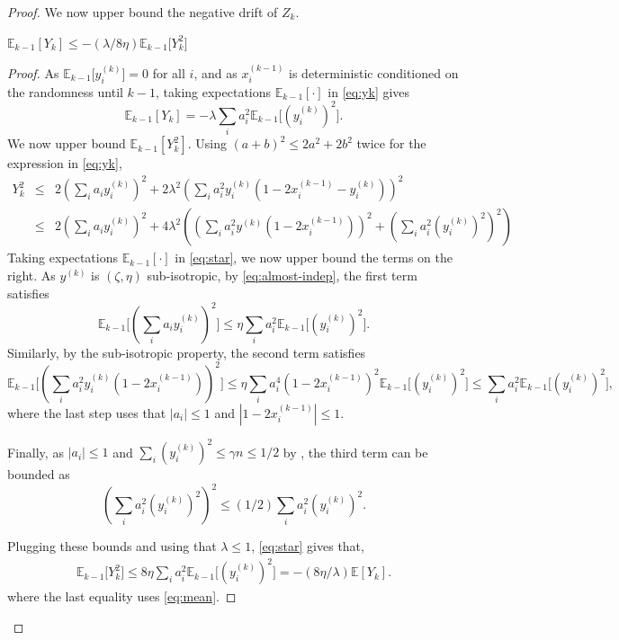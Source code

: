 \documentclass{toc}
\newcommand{\E}{\mathbb{E}}
\begin{document}
\begin{proof}
We now upper bound the negative drift of $Z_k$.
\begin{claim}
\label{cool-calc}
$  \E_{k-1}[Y_k] \leq - (\lambda/8 \eta)  \E_{k-1}\big[Y_k^2 \big] $
\end{claim}
\begin{proof}
As $\E_{k-1}\big[y_i^{(k)}\big]=0$ for all $i$, and as $x_i^{(k-1)}$ is deterministic conditioned on the randomness until $k-1$,  taking expectations $\E_{k-1}[\cdot ]$ in \eqref{eq:yk} gives
\begin{equation}
    \label{eq:mean}
 \E_{k-1}[Y_k] = -\lambda \sum_i a_i^2 \E_{k-1}\big[(y_i^{(k)})^2\big].
\end{equation}
We now upper bound $\E_{k-1}[Y_k^2]$.
Using $(a+b)^2 \leq 2 a^2 + 2b^2$ twice for the expression in \eqref{eq:yk},
\begin{eqnarray}
Y_k^2  & \leq &  2 (\sum_i a_i y_i^{(k)})^2
+ 2   \lambda^2 \left(\sum_i a_i^2  y_i^{(k)} (1- 2  x_i^{(k-1)} - y_i^{(k)}) \right)^2 \nonumber \\
 & \leq &   2 (\sum_i a_i y_i^{(k)})^2 + 4 \lambda^2 \left( \left(\sum_i a_i^2 y^{(k)} (1- 2  x_i^{(k-1)}) \right)^2  + \left(\sum_i a_i^2  (y_i^{(k)})^2 \right)^2 \right)  \label{eq:star}
%
\end{eqnarray}
%
%
%
Taking expectations $\E_{k-1}[\cdot ]$ in \eqref{eq:star}, we now upper bound the terms on the right.
%
%
%
%
%
As $y^{(k)}$ is $(\zeta,\eta)$ sub-isotropic, by \eqref{eq:almost-indep}, the first term satisfies
\[\E_{k-1}\Big[(\sum_i a_i y_i^{(k)})^2 \Big] \leq \eta \sum_i a_i^2
\E_{k-1}\big[(y_i^{(k)})^2\big].\]
Similarly, by the sub-isotropic property, the second term satisfies
\[ \E_{k-1}\Big[(\sum_i a_i^2 y_i^{(k)} (1-2x_i^{(k-1)}))^2 \Big]  \leq   \eta \sum_i a_i^4 (1-2x_i^{(k-1)})^2  \E_{k-1}
\big[(y_i^{(k)})^2\big]  \leq   \sum_i a_i^2 \E_{k-1}
\big[(y_i^{(k)})^2\big],\]
%
where the last step uses that $|a_i|\leq 1$ and $|1-2x_i^{(k-1)}| \leq 1$.
%
%

Finally, as $|a_i| \leq 1$ and $\sum_i (y_i^{(k)})^2 \leq \gamma n \leq 1/2$ by , the third term can be bounded as
\begin{equation}
\label{eq:star1}
 \left(\sum_i a_i^2  (y_i^{(k)})^2\right)^2 \leq  (1/2 ) \sum_i a_i^2  (y_i^{(k)})^2.
\end{equation}

Plugging these bounds and using that $\lambda \leq 1$, \eqref{eq:star} gives that,
 \begin{eqnarray*}
 \E_{k-1}\big[Y_k^2\big]  \leq   8 \eta \sum_i a_i^2 \E_{k-1}\big[(y_i^{(k)})^2\big]  =  - (8 \eta/\lambda)  \E[Y_k].
\end{eqnarray*}
where the last equality uses \eqref{eq:mean}.
%
%
\end{proof}


\end{proof}
\end{document}
